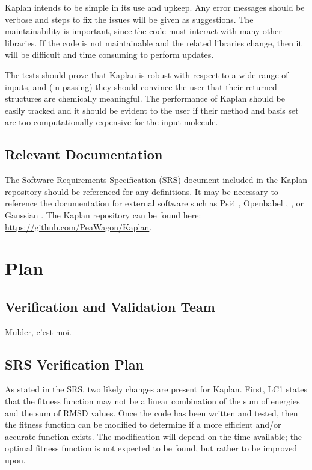 \documentclass[12pt, titlepage]{article}
\newcommand{\progname}{Kaplan} %
\begin{document}
\progname{} intends to be simple in its use and upkeep. Any error messages 
should be verbose and steps to fix the issues will be given as suggestions. The 
maintainability is important, since the code must interact with many other 
libraries. If the code is not maintainable and the related libraries change, 
then it will be difficult and time consuming to perform updates. 

The tests should prove that \progname{} is robust with respect to a wide range 
of inputs, and (in passing) they should convince the user that their returned 
structures are chemically meaningful. The performance of \progname{} should be 
easily tracked and it should be evident to the user if their method and basis 
set are too computationally expensive for the input molecule.

\subsection{Relevant Documentation}

The Software Requirements Specification (SRS) document included in the 
\progname{} repository should be referenced for any definitions. It may be 
necessary to reference the documentation for external software such as Psi4 
\cite{psi4}, Openbabel \cite{obabel}, \cite{obabel-web}, or Gaussian \cite{g16}.
The \progname{} repository can be found here:
\url{https://github.com/PeaWagon/Kaplan}.

\section{Plan} \label{section-plans}
	
\subsection{Verification and Validation Team}

Mulder, c'est moi.

\subsection{SRS Verification Plan}

As stated in the SRS, two likely changes are present for \progname{}. First, 
LC1 states that the fitness function may not be a linear combination of the sum 
of energies and the sum of RMSD values. Once the code has been written and 
tested, then the fitness function can be modified to determine if a more 
efficient and/or accurate function exists. The modification will depend on the 
time available; the optimal fitness function is not expected to be found, but 
rather to be improved upon.
\end{document}
